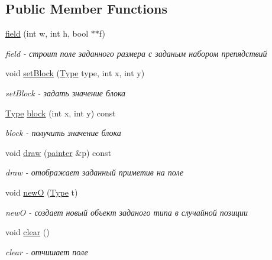 \subsection*{Public Member Functions}
\begin{DoxyCompactItemize}
\item 
\hyperlink{classfield_a26b09d2e9cf52d1dca855e4b2b0ecc1c}{field} (int w, int h, bool $\ast$$\ast$f)
\begin{DoxyCompactList}\small\item\em field -\/ строит поле заданного размера с заданым набором препядствий \end{DoxyCompactList}\item 
void \hyperlink{classfield_abab6fad3d032bfbf90b01061a94ace8f}{set\+Block} (\hyperlink{classfield_a4910f59c849d43bf598b42fc47c91fba}{Type} type, int x, int y)
\begin{DoxyCompactList}\small\item\em set\+Block -\/ задать значение блока \end{DoxyCompactList}\item 
\hyperlink{classfield_a4910f59c849d43bf598b42fc47c91fba}{Type} \hyperlink{classfield_aaa9d47268100ef05881a520a0a3cd03b}{block} (int x, int y) const 
\begin{DoxyCompactList}\small\item\em block -\/ получить значение блока \end{DoxyCompactList}\item 
void \hyperlink{classfield_ae47f26cdf47b171204c3227c3246e307}{draw} (\hyperlink{classpainter}{painter} \&p) const 
\begin{DoxyCompactList}\small\item\em draw -\/ отображает заданный приметив на поле \end{DoxyCompactList}\item 
void \hyperlink{classfield_a45a3a4059cd2878eb9dba6bfb7ef6b26}{new\+O} (\hyperlink{classfield_a4910f59c849d43bf598b42fc47c91fba}{Type} t)
\begin{DoxyCompactList}\small\item\em new\+O -\/ создает новый объект заданого типа в случайной позиции \end{DoxyCompactList}\item 
\hypertarget{classfield_ae97437dfcb63a1bf1a3c5184d660581e}{}void \hyperlink{classfield_ae97437dfcb63a1bf1a3c5184d660581e}{clear} ()\label{classfield_ae97437dfcb63a1bf1a3c5184d660581e}

\begin{DoxyCompactList}\small\item\em clear -\/ отчишает поле \end{DoxyCompactList}\end{DoxyCompactItemize}
